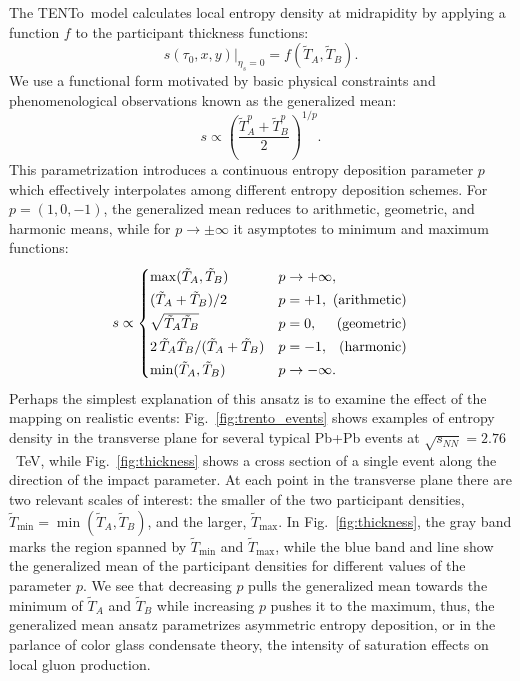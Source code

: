 \documentclass[aps,prc,reprint,amsmath,nofootinbib]{revtex4-1}
\newcommand{\trento}{T\raisebox{-0.5ex}{R}ENTo}
\newcommand{\sqrts}{\sqrt{s_{NN}}}
\newcommand{\T}{\tilde{T}}
\begin{document}
The \trento\ model calculates local entropy density at midrapidity by applying a function $f$ to the participant thickness functions:
\begin{equation}
  s(\tau_0, x, y)\vert_{\eta_s=0} = f(\T_A, \T_B).
  \label{eq:mapping}
\end{equation}
We use a functional form motivated by basic physical constraints and phenomenological observations \cite{Moreland:2014oya} known as the generalized mean:
\begin{equation}
  s \propto \left( \frac{\T_A^p + \T_B^p}{2} \right)^{1/p}.
  \label{eq:genmean}
\end{equation}
This parametrization introduces a continuous entropy deposition parameter $p$ which effectively interpolates among different entropy deposition schemes.
For ${p=(1, 0, -1)}$, the generalized mean reduces to arithmetic, geometric, and harmonic means, while for ${p \rightarrow \pm\infty}$ it asymptotes to minimum and maximum functions:
\begin{equation}
  \newlength{\extraspace}
  \setlength{\extraspace}{0.5ex}
  s \propto
  \begin{cases}
    \max(\T_A, \T_B) & p \rightarrow +\infty, \\[\extraspace]
    (\T_A + \T_B)/2 & p = +1, \hfill \text{ (arithmetic)} \\[\extraspace]
    \sqrt{\T_A \T_B} & p = 0, \hfill \text{ (geometric)} \\[\extraspace]
    2\, \T_A \T_B/(\T_A + \T_B) & p = -1, \hfill \text{ (harmonic)} \\[\extraspace]
    \min(\T_A, \T_B) & p \rightarrow -\infty.
  \end{cases}
  \label{eq:means}
\end{equation}
Perhaps the simplest explanation of this ansatz is to examine the effect of the mapping on realistic events:
Fig.~\ref{fig:trento_events} shows examples of entropy density in the transverse plane for several typical Pb+Pb events at $\sqrts=2.76$~TeV,
while Fig.~\ref{fig:thickness} shows a cross section of a single event along the direction of the impact parameter.
At each point in the transverse plane there are two relevant scales of interest:
the smaller of the two participant densities, $\T_\text{min} = \min(\T_A, \T_B)$, and the larger, $\T_\text{max}$.
In Fig.~\ref{fig:thickness}, the gray band marks the region spanned by $\T_\text{min}$ and $\T_\text{max}$, while the blue band and line show the generalized mean of the participant densities for different values of the parameter $p$.
We see that decreasing $p$ pulls the generalized mean towards the minimum of $\T_A$ and $\T_B$ while increasing $p$ pushes it to the maximum, thus, the generalized mean ansatz parametrizes asymmetric entropy deposition, or in the parlance of color glass condensate theory, the intensity of saturation effects on local gluon production.
\end{document}
